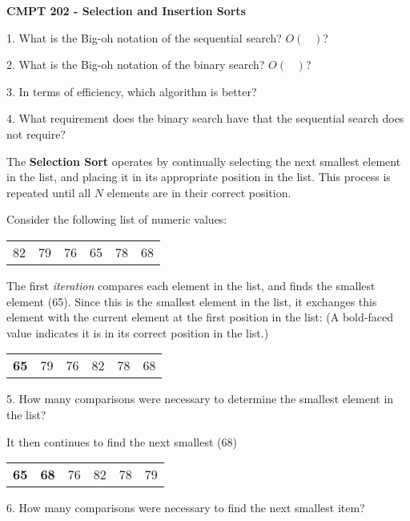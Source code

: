 \documentclass[11pt]{article}
\begin{document}
{\large {\bf CMPT 202 - Selection and Insertion Sorts}} 

1. What is the Big-oh notation of the sequential search? $O(\;\;\;  )$?

2. What is the Big-oh notation of the binary search? $O(\;\;\;  )$?

3. In terms of efficiency, which algorithm is better?

4. What requirement does the binary search have that the sequential search does not require? 

\vspace*{.25in}

The {\bf Selection Sort} operates by continually selecting the next smallest element in the list, and placing it in its appropriate position in the list. This process is repeated until all $N$ elements are in their correct position.

Consider the following list of numeric values:

\begin{tabular}{c c c c c c}

82 & 79 & 76 & 65 & 78 & 68 \\

\end{tabular}

The first {\it iteration} compares each element in the list, and finds the smallest element (65). Since this is the smallest element in the list, it exchanges this element with the current element at the first position in the list: (A bold-faced value indicates it is in its correct position in the list.)

\begin{tabular}{c c c c c c}

{\bf 65} & 79 & 76 & 82 & 78 & 68 \\

\end{tabular}

5. How many comparisons were necessary to determine the smallest element in the list?

It then continues to find the next smallest (68)

\begin{tabular}{c c c c c c}

{\bf 65} & {\bf 68} & 76 & 82 & 78 & 79 \\

\end{tabular}

6. How many comparisons were necessary to find the next smallest item?
\end{document}
